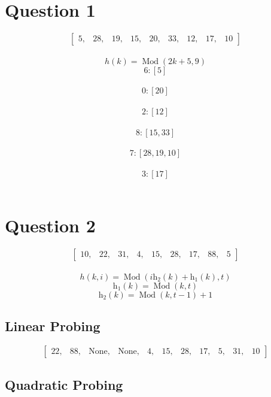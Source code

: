 \documentclass{article}
\begin{document}
\section*{Question 1}
\nonstopmode
$$\begin{bmatrix}5, & 28, & 19, & 15, & 20, & 33, & 12, & 17, & 10\end{bmatrix}$$\\
$$h(k) = \operatorname{Mod}{\left (2 k + 5,9 \right )}$$
$$ 6 : [5]$$\\
$$ 0 : [20]$$\\
$$ 2 : [12]$$\\
$$ 8 : [15, 33]$$\\
$$ 7 : [28, 19, 10]$$\\
$$ 3 : [17]$$\\
\section*{Question 2}
$$\begin{bmatrix}10, & 22, & 31, & 4, & 15, & 28, & 17, & 88, & 5\end{bmatrix}$$\\
\begin{equation}
h{\left (k,i \right )}
 = 
\operatorname{Mod}{\left (i \operatorname{h_{2}}{\left (k \right )} + \operatorname{h_{1}}{\left (k \right )},t \right )}
\end{equation}
\begin{equation}
\operatorname{h_{1}}{\left (k \right )}
 = 
\operatorname{Mod}{\left (k,t \right )}
\end{equation}
\begin{equation}
\operatorname{h_{2}}{\left (k \right )}
 = 
\operatorname{Mod}{\left (k,t - 1 \right )} + 1
\end{equation}
\subsection*{Linear Probing}
\begin{equation}\begin{bmatrix}22, & 88, & \mathrm{None}, & \mathrm{None}, & 4, & 15, & 28, & 17, & 5, & 31, & 10\end{bmatrix}\end{equation}
\subsection*{Quadratic Probing}
\end{document}
